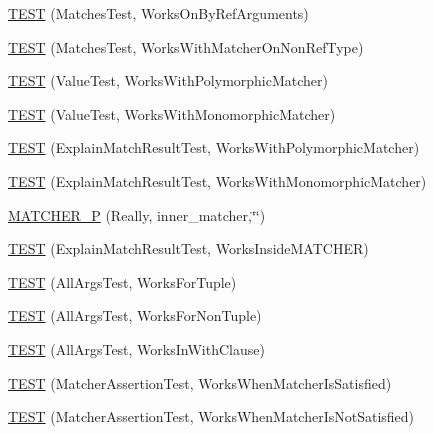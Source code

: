 \begin{DoxyCompactItemize}
\item 
\hyperlink{namespacetesting_1_1gmock__matchers__test_a6cfa391c9035262ccdc0d8f59e037b4d}{T\+E\+ST} (Matches\+Test, Works\+On\+By\+Ref\+Arguments)
\item 
\hyperlink{namespacetesting_1_1gmock__matchers__test_a9fd734ae5afb64a7285503bc0870c255}{T\+E\+ST} (Matches\+Test, Works\+With\+Matcher\+On\+Non\+Ref\+Type)
\item 
\hyperlink{namespacetesting_1_1gmock__matchers__test_a150118d4e990ba9fb9978329e742c931}{T\+E\+ST} (Value\+Test, Works\+With\+Polymorphic\+Matcher)
\item 
\hyperlink{namespacetesting_1_1gmock__matchers__test_a53403682e9ffc12152b0b1c7f55dfa12}{T\+E\+ST} (Value\+Test, Works\+With\+Monomorphic\+Matcher)
\item 
\hyperlink{namespacetesting_1_1gmock__matchers__test_a985e2bc1546b67de764d759de111e8e9}{T\+E\+ST} (Explain\+Match\+Result\+Test, Works\+With\+Polymorphic\+Matcher)
\item 
\hyperlink{namespacetesting_1_1gmock__matchers__test_aeff2711a03b27a66c1c98ed97ff49b09}{T\+E\+ST} (Explain\+Match\+Result\+Test, Works\+With\+Monomorphic\+Matcher)
\item 
\hyperlink{namespacetesting_1_1gmock__matchers__test_ae59dd69f7bc69e592dc851fef825d0ba}{M\+A\+T\+C\+H\+E\+R\+\_\+P} (Really, inner\+\_\+matcher,\char`\"{}\char`\"{})
\item 
\hyperlink{namespacetesting_1_1gmock__matchers__test_ae57edef8890da6b929dd0d21c2f7c071}{T\+E\+ST} (Explain\+Match\+Result\+Test, Works\+Inside\+M\+A\+T\+C\+H\+ER)
\item 
\hyperlink{namespacetesting_1_1gmock__matchers__test_aeea300647af4c7611f4e491cabcbf950}{T\+E\+ST} (All\+Args\+Test, Works\+For\+Tuple)
\item 
\hyperlink{namespacetesting_1_1gmock__matchers__test_aacc3ed6d6a0f9ff552019d0d58817b6f}{T\+E\+ST} (All\+Args\+Test, Works\+For\+Non\+Tuple)
\item 
\hyperlink{namespacetesting_1_1gmock__matchers__test_ad62534535946b2ef45457fb653f73a98}{T\+E\+ST} (All\+Args\+Test, Works\+In\+With\+Clause)
\item 
\hyperlink{namespacetesting_1_1gmock__matchers__test_ad37559f9112c04334a62ce9617cf1349}{T\+E\+ST} (Matcher\+Assertion\+Test, Works\+When\+Matcher\+Is\+Satisfied)
\item 
\hyperlink{namespacetesting_1_1gmock__matchers__test_a2f3755be7052d6e7769e3323053399d0}{T\+E\+ST} (Matcher\+Assertion\+Test, Works\+When\+Matcher\+Is\+Not\+Satisfied)

\end{DoxyCompactItemize}

